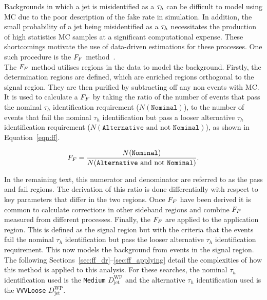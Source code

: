 Backgrounds in which a jet is misidentified as a $\tau_{h}$ can be difficult to model using \ac{MC} due to the poor description of the \jtth fake rate in simulation. 
In addition, the small probability of a jet being misidentified as a $\tau_{h}$ necessitates the production of high statistics \ac{MC} samples at a significant computational expense.
These shortcomings motivate the use of data-driven estimations for these processes. 
One such procedure is the $F_{F}$ method~\cite{Sirunyan:2018zut,CMS:2018lkr}. \\

The $F_{F}$ method utilises regions in the data to model the \jtth background. 
Firstly, the determination regions are defined, which are \jtth enriched regions orthogonal to the signal region. 
They are then purified by subtracting off any non \jtth events with \ac{MC}.
It is used to calculate a $F_{F}$ by taking the ratio of the number of \jtth events that pass the nominal $\tau_h$ identification requirement ($N(\texttt{Nominal})$), to the number of \jtth events that fail the nominal $\tau_h$ identification but pass a looser alternative $\tau_h$ identification requirement ($N(\texttt{Alternative}\text{ and not }\texttt{Nominal})$), as shown in Equation~\ref{eqn:ff}.

\begin{equation}
F_{F} = \frac{N(\texttt{Nominal})}{N(\texttt{Alternative}\text{ and not }\texttt{Nominal})}.
\label{eqn:ff}
\end{equation}

In the remaining text, this numerator and denominator are referred to as the pass and fail regions.
The derivation of this ratio is done differentially with respect to key parameters that differ in the two regions.
Once $F_{F}$ have been derived it is common to calculate corrections in other sideband regions and combine $F_{F}$ measured from different processes.
Finally, the $F_{F}$ are applied to the application region. 
This is defined as the signal region but with the criteria that the \jtth events fail the nominal $\tau_h$ identification but pass the looser alternative $\tau_h$ identification requirement.
This now models the background from \jtth events in the signal region. \\

The following Sections~\ref{sec:ff_dr}--\ref{sec:ff_applying} detail the complexities of how this method is applied to this analysis.
For these searches, the nominal $\tau_h$ identification used is the \texttt{Medium} $D_{\text{jet}}^{\text{WP}}$ and the alternative $\tau_h$ identification used is the \texttt{VVVLoose} $D_{\text{jet}}^{\text{WP}}$.

